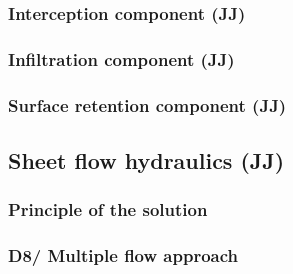         \subsubsection{Interception component (JJ)}
        \subsubsection{Infiltration component (JJ) }

 

 

        \subsubsection{Surface retention component (JJ)}
    \subsection{Sheet flow hydraulics (JJ)}
        \subsubsection{Principle of the solution}


        \subsubsection{D8/ Multiple flow approach}

